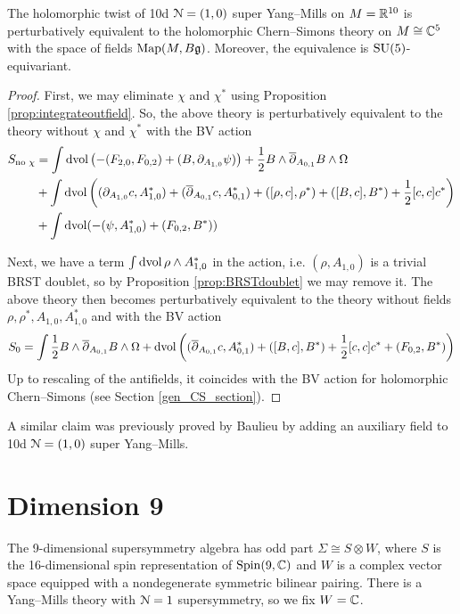 \documentclass[10pt, oneside]{article}
\begin{document}
\begin{theorem}
The holomorphic twist of 10d $\mathcal{N}=(1, 0)$ super Yang--Mills on $M=\mathbb R^{10}$ is perturbatively equivalent to the holomorphic Chern--Simons theory on $M\cong\mathbb C^5$ with the space of fields $\operatorname{Map}(M, B\mathfrak{g})$. Moreover, the equivalence is $\mathrm{SU}(5)$-equivariant.
\label{thm:10dholomorphictwist}
\end{theorem}
\begin{proof}
First, we may eliminate $\chi$ and $\chi^*$ using Proposition \ref{prop:integrateoutfield}. So, the above theory is perturbatively equivalent to the theory without $\chi$ and $\chi^*$ with the BV action
\begin{align*}
S_{\text{no }\chi} &= \int \operatorname{dvol} \left(-(F_{2, 0}, F_{0, 2}) + (B, \partial_{A_{1, 0}} \psi)\right)  + \frac{1}{2}B\wedge \overline{\partial}_{A_{0, 1}} B\wedge\Omega \\
&+ \int \operatorname{dvol}\left((\partial_{A_{1, 0}} c, A_{1, 0}^*) + (\overline{\partial}_{A_{0, 1}} c, A_{0, 1}^*) + ([\rho, c], \rho^*) + ([B, c], B^*) + \frac{1}{2}[c, c]c^*\right) \\
&+ \int \operatorname{dvol}(-(\psi, A_{1, 0}^*) + (F_{0, 2}, B^*))
\end{align*}

Next, we have a term $\int \operatorname{dvol} \rho\wedge A_{1, 0}^*$ in the action, i.e. $(\rho, A_{1, 0})$ is a trivial BRST doublet, so by Proposition \ref{prop:BRSTdoublet} we may remove it. The above theory then becomes perturbatively equivalent to the theory without fields $\rho,\rho^*,A_{1,0},A_{1,0}^*$ and with the BV action
\[
S_0 = \int \frac{1}{2}B\wedge \overline{\partial}_{A_{0, 1}} B\wedge\Omega + \operatorname{dvol}\left((\overline{\partial}_{A_{0, 1}} c, A_{0, 1}^*) + ([B, c], B^*) + \frac{1}{2}[c, c]c^* + (F_{0, 2}, B^*)\right)
\]
Up to rescaling of the antifields, it coincides with the BV action for holomorphic Chern--Simons (see Section \ref{gen_CS_section}).
\end{proof}

\begin{remark}
A similar claim was previously proved by Baulieu \cite{Baulieu} by adding an auxiliary field to 10d $\mathcal{N}=(1, 0)$ super Yang--Mills.
\end{remark}

\section{Dimension 9}

The 9-dimensional supersymmetry algebra has odd part $\Sigma\cong S\otimes W$, where $S$ is the 16-dimensional spin representation of $\mathrm{Spin}(9, \mathbb C)$ and $W$ is a complex vector space equipped with a nondegenerate symmetric bilinear pairing. There is a Yang--Mills theory with $\mathcal{N}=1$ supersymmetry, so we fix $W = \mathbb C$.
\end{document}
